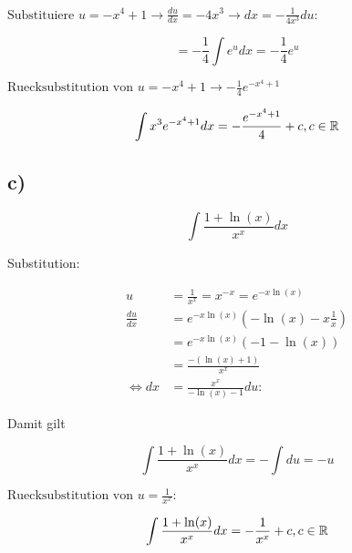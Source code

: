 \documentclass[a4paper, 11pt]{article}
\begin{document}
\begin{math}
    \text{Substituiere } u = -x^4+1 \rightarrow \frac{du}{dx} = -4x^3 \rightarrow dx = -\frac{1}{4x^3}du:
\end{math}

\begin{equation*}
    = -\frac{1}{4} \int e^u dx = - \frac{1}{4}e^u
\end{equation*}

\begin{math}
    \text{Ruecksubstitution von } u = -x^4+1 \rightarrow -\frac{1}{4}e^{-x^4+1}
\end{math}

\begin{equation*}
    \int x^3e^{-x^4+1}dx = - \frac{e^{-x^4+1}}{4}+c, c \in \mathbb{R}
\end{equation*}

\subsection{c)}
\label{sec:org3914fda}
\begin{equation*}
\int \frac{1+\ln(x)}{x^x}dx
\end{equation*}

Substitution:

\begin{align*}
    u &= \frac{1}{x^x} = x^{-x} = e^{-x\ln(x)} \\
    \frac{du}{dx} &= e^{-x\ln(x)} (-\ln(x) - x \frac{1}{x}) \\
    &= e^{-x\ln(x)} (-1 - \ln(x)) \\
    &= \frac{-(\ln(x)+1)}{x^x} \\
    \Leftrightarrow dx &= \frac{x^x}{-\ln(x)-1}du:
\end{align*}

Damit gilt

\begin{equation*}
    \int \frac{1+\ln(x)}{x^x}dx = - \int du = -u
\end{equation*}

\begin{math}
\text{Ruecksubstitution von  } u = \frac{1}{x^x}:
\end{math}

\begin{equation*}
\int \frac{1+\ln(x)}{x^x}dx = -\frac{1}{x^x}+c, c \in \mathbb{R}
\end{equation*}
\end{document}
